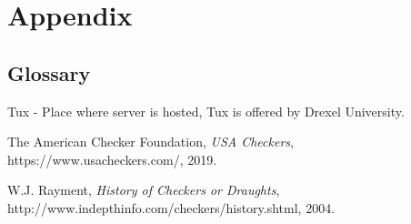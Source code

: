 \documentclass{scrreprt}
\begin{document}
\chapter{Appendix}
\section{Glossary}
Tux - Place where server is hosted, Tux is offered by Drexel University.


\begin{thebibliography}{9}

  The American Checker Foundation,
  \textit{USA Checkers},
  https://www.usacheckers.com/,
  2019.

W.J. Rayment,
\textit{History of Checkers or Draughts},
http://www.indepthinfo.com/checkers/history.shtml,
2004.

\end{thebibliography}
\end{document}
